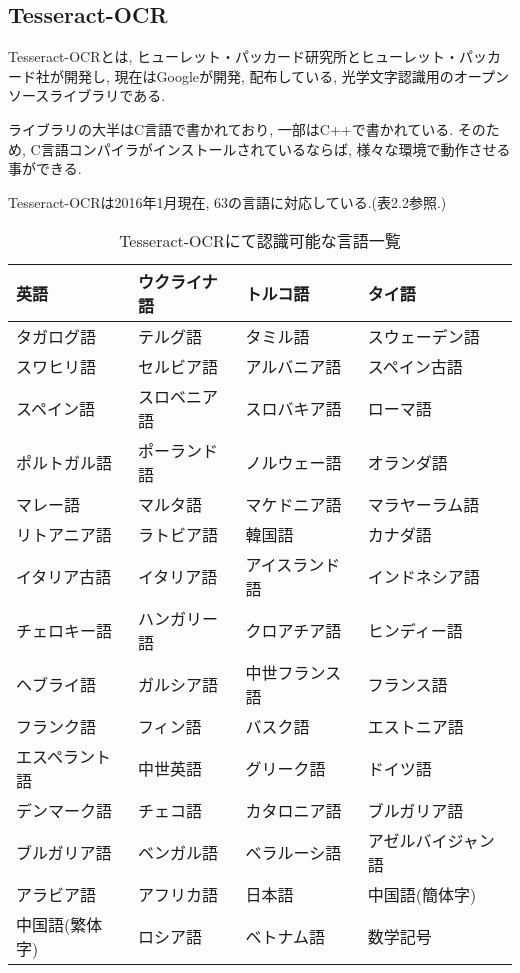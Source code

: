 \subsection{Tesseract-OCR}
Tesseract-OCRとは, ヒューレット・パッカード研究所とヒューレット・パッカード社が開発し, 現在はGoogleが開発, 配布している, 光学文字認識用のオープンソースライブラリである.

ライブラリの大半はC言語で書かれており, 一部はC++で書かれている.
そのため, C言語コンパイラがインストールされているならば, 様々な環境で動作させる事ができる.

Tesseract-OCRは2016年1月現在, 63の言語に対応している.(表2.2参照.)

\begin{table}[htb]
\begin{center}
\begin{tabular}{|p{3.5cm}|p{3.5cm}|p{3.5cm}|p{3.5cm}|} \hline
英語 & ウクライナ語 & トルコ語 & タイ語 \\ \hline
タガログ語 & テルグ語 & タミル語 & スウェーデン語 \\ \hline
スワヒリ語 & セルビア語 & アルバニア語 & スペイン古語 \\ \hline
スペイン語 & スロベニア語 & スロバキア語 & ローマ語 \\ \hline
ポルトガル語 & ポーランド語 & ノルウェー語 & オランダ語 \\ \hline
マレー語 & マルタ語 & マケドニア語 & マラヤーラム語 \\ \hline
リトアニア語 & ラトビア語 & 韓国語 & カナダ語 \\ \hline
イタリア古語 & イタリア語 & アイスランド語 & インドネシア語 \\ \hline
チェロキー語 & ハンガリー語 & クロアチア語 & ヒンディー語 \\ \hline
ヘブライ語 & ガルシア語 & 中世フランス語 & フランス語 \\ \hline
フランク語 & フィン語 & バスク語 & エストニア語 \\ \hline
エスペラント語 & 中世英語 & グリーク語 & ドイツ語 \\ \hline
デンマーク語 & チェコ語 & カタロニア語 & ブルガリア語 \\ \hline
ブルガリア語 & ベンガル語 & ベラルーシ語 & アゼルバイジャン語 \\ \hline
アラビア語 & アフリカ語 & 日本語 & 中国語(簡体字) \\ \hline
中国語(繁体字) & ロシア語 & ベトナム語 & 数学記号 \\ \hline
\end{tabular}
\caption{Tesseract-OCRにて認識可能な言語一覧}
\end{center}
\end{table}


